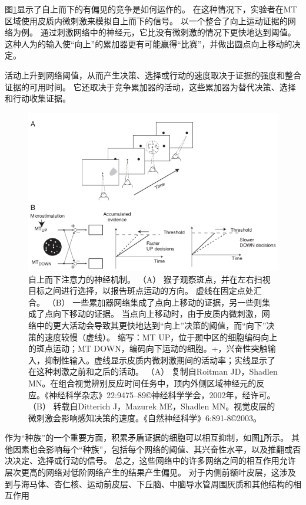图\ref{fig:3_5}显示了自上而下的有偏见的竞争是如何运作的。
在这种情况下，实验者在MT区域使用皮质内微刺激来模拟自上而下的信号。
以一个整合了向上运动证据的网络为例。
通过刺激网络中的神经元，它比没有微刺激的情况下更快地达到阈值。
这种人为的输入使“向上”的累加器更有可能赢得“比赛”，并做出圆点向上移动的决定。\par


活动上升到网络阈值，从而产生决策、选择或行动的速度取决于证据的强度和整合证据的可用时间。
它还取决于竞争累加器的活动，这些累加器为替代决策、选择和行动收集证据。\par


\begin{figure}[!htb]
	\centering
	\includegraphics{image_pfc/Fig_3_5}
	\caption*{自上而下注意力的神经机制。
		（A） 猴子观察斑点，并在左右扫视目标之间进行选择，以报告斑点运动的方向。
		虚线在固定点处汇合。
		（B） 一些累加器网络集成了点向上移动的证据，另一些则集成了点向下移动的证据。
		当点向上移动时，由于皮质内微刺激，网络中的更大活动会导致其更快地达到“向上”决策的阈值，而“向下”决策的速度较慢（虚线）。
		缩写：MT UP，位于颞中区的细胞编码向上的斑点运动；MT DOWN，编码向下运动的细胞。+，兴奋性突触输入，抑制性输入。虚线显示皮质内微刺激期间的活动率；实线显示了在这种刺激之前和之后的活动。
		（A） 复制自Roitman JD，Shadlen MN。在组合视觉辨别反应时间任务中，顶内外侧区域神经元的反应。《神经科学杂志》22:9475–89©神经科学学会，2002年，经许可。
		（B） 转载自Ditterich J，Mazurek ME，Shadlen MN。视觉皮层的微刺激会影响感知决策的速度。《自然神经科学》6:891-8©2003。}
	\label{fig:3_5}
\end{figure}


作为“种族”的一个重要方面，积累矛盾证据的细胞可以相互抑制，如图\ref{fig:3_5}所示。
其他因素也会影响每个“种族”，包括每个网络的阈值、其兴奋性水平，以及推翻或否决决定、选择或行动的信号。
总之，这些网络中的许多网络之间的相互作用允许层次更高的网络对低阶网络产生的结果产生偏见。
对于内侧前额叶皮层，这涉及到与海马体、杏仁核、运动前皮层、下丘脑、中脑导水管周围灰质和其他结构的相互作用\par



